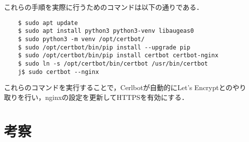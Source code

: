 \documentclass[divpdfmx]{jlreq}
\begin{document}
これらの手順を実際に行うためのコマンドは以下の通りである．
\begin{lstlisting}
    $ sudo apt update
    $ sudo apt install python3 python3-venv libaugeas0
    $ sudo python3 -m venv /opt/certbot/
    $ sudo /opt/certbot/bin/pip install --upgrade pip
    $ sudo /opt/certbot/bin/pip install certbot certbot-nginx
    $ sudo ln -s /opt/certbot/bin/certbot /usr/bin/certbot
    j$ sudo certbot --nginx
\end{lstlisting}
これらのコマンドを実行することで，Cerlbotが自動的にLet's Encryptとのやり取りを行い，nginxの設定を更新してHTTPSを有効にする．
\section{考察}
\end{document}
